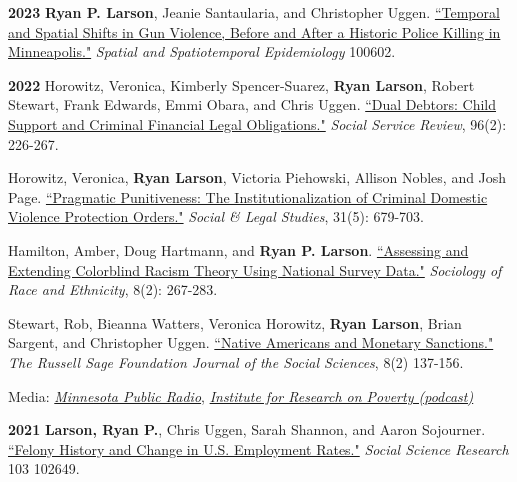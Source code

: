 \documentclass[letterpaper]{article}
\newenvironment{publist}{%
  \begin{list}{}{%
    \setlength{\leftmargin}{0cm}   %
    \setlength{\labelwidth}{2cm}     %
    \setlength{\labelsep}{0.5cm}     %
  }%
}{%
  \end{list}%
}
\renewenvironment{itemize}{
  \begin{list}{}{
    \setlength{\leftmargin}{1.5em}
  }
}{
  \end{list}
}
\begin{document}
\begin{publist}
\item[\textbf{2023}] \textbf{Ryan P. Larson}, Jeanie Santaularia, and Christopher Uggen. \href{https://ryanplarson.github.io/personal_site/pubs/larson_etal_23_online.pdf}{``Temporal and Spatial Shifts in Gun Violence, Before and After a Historic Police Killing in Minneapolis."} \textit{Spatial and Spatiotemporal Epidemiology} 100602.

\item[\textbf{2022}] Horowitz, Veronica, Kimberly Spencer-Suarez, \textbf{Ryan Larson}, Robert Stewart, Frank Edwards, Emmi Obara, and Chris Uggen. \href{https://ryanplarson.github.io/personal_site/pubs/horowitz_etal_22.pdf}{``Dual Debtors: Child Support and Criminal Financial Legal Obligations."} \textit{Social Service Review}, 96(2): 226-267.

\item Horowitz, Veronica,  \textbf{Ryan Larson}, Victoria Piehowski, Allison Nobles, and Josh Page. \href{https://ryanplarson.github.io/personal_site/pubs/horowitz_etal_21.pdf}{``Pragmatic Punitiveness: The Institutionalization of Criminal Domestic Violence Protection Orders."} \textit{Social \& Legal Studies}, 31(5): 679-703.

\item Hamilton, Amber, Doug Hartmann, and \textbf{Ryan P. Larson}. \href{https://ryanplarson.github.io/personal_site/pubs/hamilton_etal_22.pdf}{``Assessing and Extending Colorblind Racism Theory Using National Survey Data."} \textit{Sociology of Race and Ethnicity}, 8(2): 267-283.

\item Stewart, Rob, Bieanna Watters, Veronica Horowitz, \textbf{Ryan Larson}, Brian Sargent, and Christopher Uggen. \href{https://ryanplarson.github.io/personal_site/pubs/stewart_etal_22.pdf}{``Native Americans and Monetary Sanctions."} \textit{The Russell Sage Foundation Journal of the Social Sciences}, 8(2) 137-156.

\begin{itemize}
\item Media: \href{https://www.mprnews.org/story/2022/04/21/native-women-incarcerated}{\textit{Minnesota Public Radio}}, \href{https://www.irp.wisc.edu/resource/brieanna-watters-and-robert-stewart-on-native-americans-and-monetary-sanctions/}{\textit{Institute for Research on Poverty (podcast)}}
\end{itemize}

\item[\textbf{2021}] \textbf{Larson, Ryan P.}, Chris Uggen, Sarah Shannon, and Aaron Sojourner. \href{https://ryanplarson.github.io/personal_site/pubs/larson_etal_22.pdf}{``Felony History and Change in U.S. Employment Rates."} \textit{Social Science Research} 103 102649.


\end{publist}
\end{document}
